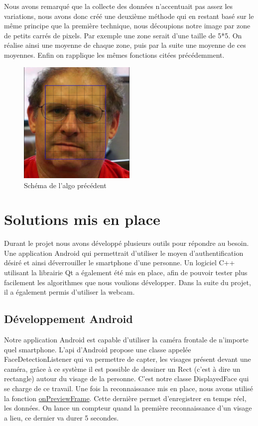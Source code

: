 Nous avons remarqué que la collecte des données n'accentuait pas assez les variations, nous avons donc créé une deuxième méthode qui en restant basé sur le même principe que la première technique, nous découpions notre image
par zone de petits carrés de pixels. Par exemple une zone serait d'une taille de 5*5. On réalise ainsi une moyenne de chaque zone, puis par la suite une moyenne de ces moyennes. Enfin on rapplique les mêmes fonctions citées précédemment.

\begin{figure}[h!]
	\centering
	\includegraphics[width=0.5\textwidth]{data/algo-schema.png}
	\caption{Schéma de l'algo précédent}
\end{figure}


\section{Solutions mis en place}

Durant le projet nous avons développé plusieurs outils pour répondre au besoin. Une application Android qui permettrait d'utiliser le moyen d'authentification désiré et ainsi déverrouiller le smartphone d'une
personne. Un logiciel C++ utilisant la librairie Qt a également été mis en place, afin de pouvoir tester plus facilement les algorithmes que nous voulions développer. Dans la suite du projet, il a également
permis d'utiliser la webcam.

\subsection{Développement Android}

Notre application Android est capable d'utiliser la caméra frontale de n'importe quel smartphone. L'api d'Android propose une classe appelée FaceDetectionListener qui va permettre de
 capter, les visages présent devant une caméra, grâce à ce système il est possible de dessiner un Rect (c'est à dire un rectangle) autour du visage de la personne. C'est notre classe
  DisplayedFace qui se charge de ce travail.
Une fois la reconnaissance mis en place, nous avons utilisé la fonction
\href{http://developer.android.com/reference/android/hardware/Camera.PreviewCallback.html#onPreviewFrame\%28byte\%5B\%5D,\%20android.hardware.Camera\%29}{onPreviewFrame}. Cette dernière permet d'enregistrer
en temps réel, les données. On lance un compteur quand la première reconnaissance d'un visage a lieu, ce dernier va durer 5 secondes.\\

